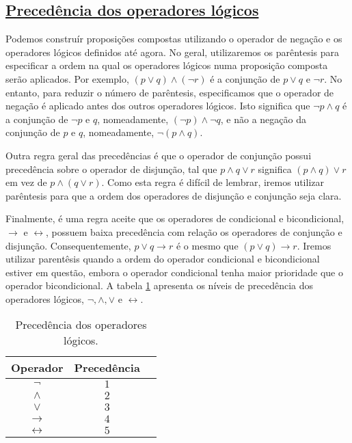 \subsection*{\underline{Precedência dos operadores lógicos}}

Podemos construír proposições compostas utilizando o operador de negação e os
operadores lógicos definidos até agora. No geral, utilizaremos os parêntesis
para especificar a ordem na qual os operadores lógicos numa proposição composta
serão aplicados. Por exemplo, $(p \lor q) \land (\lnot r)$ é a conjunção de $p
\lor q$ e $\lnot r$. No entanto, para reduzir o número de parêntesis,
especificamos que o operador de negação é aplicado antes dos outros operadores
lógicos. Isto significa que $\lnot p \land q$ é a conjunção de $\lnot p$ e $q$,
nomeadamente, $(\lnot p) \land \lnot q$, e não a negação da conjunção de $p$ e
$q$, nomeadamente, $\lnot (p \land q)$.

Outra regra geral das precedências é que o operador de conjunção possui
precedência sobre o operador de disjunção, tal que $p \land q \lor r$ significa
$(p \land q) \lor r$ em vez de $p \land (q \lor r)$. Como esta regra é difícil
de lembrar, iremos utilizar parêntesis para que a ordem dos operadores
de disjunção e conjunção seja clara.

Finalmente, é uma regra aceite que os operadores de condicional e
bicondicional, $\to$ e $\leftrightarrow$, possuem baixa precedência com relação
os operadores de conjunção e disjunção. Consequentemente, $p \lor q \to r$ é o
mesmo que $(p \lor q) \to r$. Iremos utilizar parentêsis quando a ordem do
operador condicional e bicondicional estiver em questão, embora o operador
condicional tenha maior prioridade que o operador bicondicional. A tabela
\ref{tab18} apresenta os níveis de precedência dos operadores lógicos,
$\lnot, \land, \lor$ e $\leftrightarrow$.

	
\begin{table}[H]
	\centering
	\begin{tabular}{|c|c|c|}%
	\toprule
	\textbf{Operador} & \textbf{Precedência}\\
	\midrule
	$\lnot$ & $1$ \\
	$\land$ & $2$ \\
	$\lor$ & $3$ \\
	$\to$ & $4$ \\
	$\leftrightarrow$ & $5$ \\
	\bottomrule%
	\end{tabular}%
	\caption{Precedência dos operadores lógicos.}
	\label{tab18}
\end{table}


